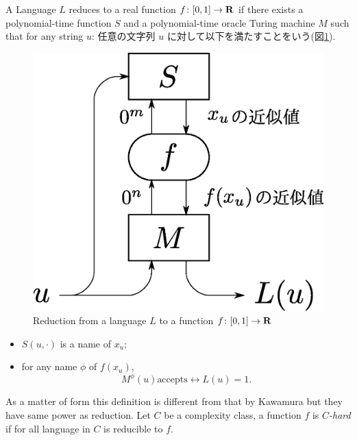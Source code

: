 \begin{definition}[Reduction]
 A Language $L$ reduces to a real function $f \colon [0, 1] \to \mathbf R$
 if there exists a polynomial-time function $S$ and a polynomial-time oracle Turing machine $M$ 
 such that for any string $u$:
  任意の文字列 $u$ に対して以下を満たすことをいう(図\ref{fig:reduction}). 
 \begin{figure}
  \begin{center}
  \includegraphics[scale=0.25]{image/reduction.eps}
  \caption{Reduction from a language $L$ to a function $f \colon [0,1] \to \mathbf R$}
  \label{fig:reduction}
  \end{center}
 \end{figure}
  \begin{itemize}
   \item $S(u, \cdot)$ is a name of $x_u$;
   \item for any name $\phi$ of $f(x_u)$,
	 \[
	  M^\phi(u) \text{accepts} \leftrightarrow L(u) = 1.
	 \]
  \end{itemize}
\end{definition}
As a matter of form this definition is different from 
that by Kawamura but they have same power as reduction.
Let $C$ be a complexity class, a function $f$ is \emph{$C$-hard}
if for all language in $C$ is reducible to $f$.
